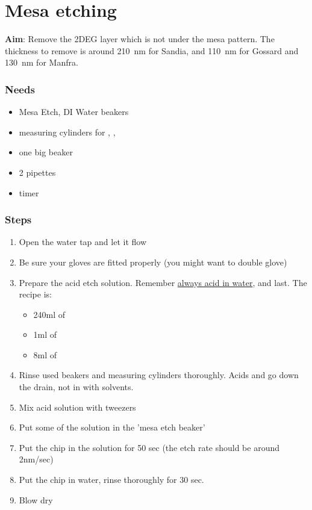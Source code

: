 \section{Mesa etching}

\textbf{Aim}:
Remove the 2DEG layer which is not under the mesa pattern. The thickness to remove is around \SI{210}{\nano\meter} for Sandia, and \SI{110}{\nano\meter} for Gossard
and \SI{130}{\nano\meter} for Manfra.

\subsubsection{Needs}
\begin{itemize}[noitemsep]
\item Mesa Etch, DI Water beakers
\item measuring cylinders for , , 
\item one big beaker
\item 2 pipettes
\item timer
\end{itemize}

\subsubsection{Steps}
\begin{enumerate}
\item Open the water tap and let it flow
\item Be sure your gloves are fitted properly (you might want to double glove)
\item Prepare the acid etch solution. Remember \underline{always acid in water}, and  last. The recipe is:
  \begin{itemize}
  \item 240ml of 
  \item 1ml of 
  \item 8ml of 
  \end{itemize}
\item Rinse used beakers and measuring cylinders thoroughly. Acids and  go down the drain, not in with solvents.
\item Mix acid solution with tweezers
\item Put some of the solution in the 'mesa etch beaker'
\item Put the chip in the solution for 50 sec (the etch rate should be around 2nm/sec)
\item Put the chip in water, rinse thoroughly for 30 sec.
\item Blow dry
\end{enumerate}
